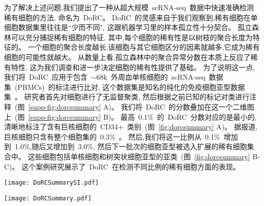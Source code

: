 为了解决上述问题,我们提出了一种从超大规模~scRNA-seq~数据中快速准确检测稀有细胞的方法,
命名为~DoRC。
DoRC~的灵感来自于我们观察到,稀有细胞在单细胞数据集里往往是``少而不同", 这跟机器学习里的样本孤立性十分契合。
孤立森林可以充分捕捉稀有细胞的特征,
其中,每个细胞的稀有性是以树枝的聚合长度为特征的。
一个细胞的聚合长度越长,该细胞与其它细胞区分的因素就越多,它成为稀有细胞的可能性就越大。
从数量上看,孤立森林中的聚合异常分数在本质上反应了稀有特性,
这为我们调查和进一步决定细胞的稀有性提供了基础。
为了说明这一点,我们将~DoRC~应用于包含~${\sim}68$k~外周血单核细胞的~scRNA-seq~数据集~(PBMCs)~的标注进行比对,
这个数据集是知名的纯化的免疫细胞亚型数据集~\cite{zheng2017massively}。
研究者首先对细胞进行了无监督聚类,
然后根据之前已知的标记对类进行注释~(图~\ref{supp-fig:dorcsummary} A)。
我们将~DoRC~的分数叠加在这一个二维图上~(图~\ref{supp-fig:dorcsummary} B)。
最高~0.1\%~的~DoRC~分数对应的是最小的, 
清晰地标注了含有巨核细胞的~CD34+~类别~(图~\ref{fig:dorcsummary} A)。
据报道,巨核细胞只含有整个细胞集的~0.3\%~\cite{zheng2017massively}。
然后,我们将这一比例从~0.1\%~增加到~1.0\%,随后又增加到~3.0\%,
然后下一批次的细胞亚型被选入扩展的稀有细胞集合中。
这些细胞包括单核细胞和树突状细胞亚型的亚类~(图~\ref{fig:dorcsummary} B-C)。
这个案例研究展示了~DoRC~在检测不同比例的稀有细胞方面的表现。

\begin{figure*}[!htbp]
    \centering
    \texttt{[image: DoRCSummarySI.pdf]}
    \caption{
    DoRC~在~PBMCs\_68k~上的性能评估。
    (A)~基于~t-SNE~的二维嵌入数据集可视化图,按~Zheng~等所报道的鉴定的不同类别用不同的颜色标记。
    (B)~PBMCs\_68k~上细胞的~DoRC~得分热图。巨核细胞群~(0.3\%),是所有细胞类型中最稀有的细胞,获得了最高的~DoRC~分数。
    (C)~使用~IQR~阈值标准后~DoRC~识别的稀有细胞。
    }
    \label{supp-fig:dorcsummary}
\end{figure*}

\begin{figure*}[!htbp]
    \centering
    \texttt{[image: DoRCSummary.pdf]}
    \caption{
    DoRC~发现了不同稀有度的细胞。在~${\sim}68$k~PBMC~数据~\cite{zheng2017massively}~中,不同级别的稀有度对应了一个数量不断增加的稀有细胞群。
    (A-C)~根据~DoRC~得分选出的前~0.1\%、1.0\%~和~3.0\%~的细胞分别以高亮显示。    
    }
    \label{fig:dorcsummary}
\end{figure*}

